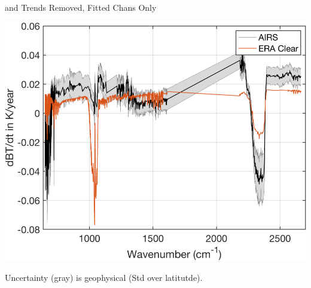 \documentclass[10pt,t]{beamer}
\begin{document}
\begin{frame}[label={sec:org4df7eb4}]{\cd and \methane Trends Removed, Fitted Chans Only}
\begin{center}
\includegraphics[width=0.75\linewidth]{./Figs/Png/rand_global_trend_l1c_vs_era_clr_only_fit_chans.png}
\end{center}

Uncertainty (gray) is geophysical (Std over latitutde).
\end{frame}
\end{document}
